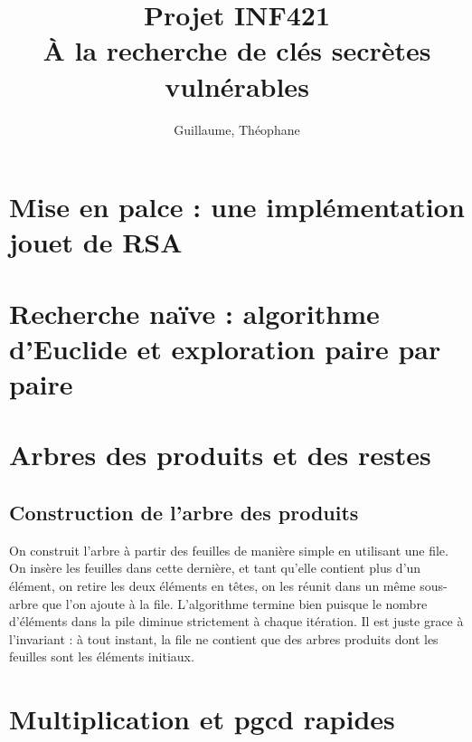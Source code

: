 \documentclass[a4paper,10pt]{article}
\title{Projet INF421 \\ À la recherche de clés secrètes vulnérables}
\author{\bsc{Hétier} Guillaume, \bsc{Hufschmitt} Théophane}
\begin{document}
\maketitle

\begin{abstract}

\end{abstract}

\section{Mise en palce : une implémentation jouet de RSA}

\section{Recherche naïve : algorithme d'Euclide et exploration paire par paire}

\section{Arbres des produits et des restes}

  \subsection{Construction de l'arbre des produits}
  On construit l'arbre à partir des feuilles de manière simple en utilisant une file. On insère les feuilles dans cette dernière, et tant qu'elle contient plus d'un élément, on retire les deux éléments en têtes, on les réunit dans un même sous-arbre que l'on ajoute à la file.
  L'algorithme termine bien puisque le nombre d'éléments dans la pile diminue strictement à chaque itération. Il est juste grace à l'invariant : à tout instant, la file ne contient que des arbres produits dont les feuilles sont les éléments initiaux.
  
  

\section{Multiplication et pgcd rapides}
\end{document}
